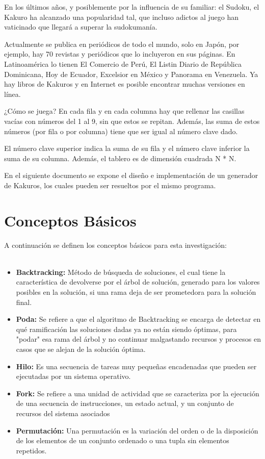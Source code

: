 \documentclass[journal]{IEEEtran}
\begin{document}
	En los últimos años, y posiblemente por la influencia de su familiar: el Sudoku, el Kakuro ha alcanzado una popularidad tal, que incluso adictos al juego han vaticinado que llegará a superar la sudokumanía.
	
	Actualmente se publica en periódicos de todo el mundo, solo en Japón, por ejemplo, hay 70 revistas y periódicos que lo incluyeron en sus páginas. En Latinoamérica lo tienen El Comercio de Perú, El Listin Diario de República Dominicana, Hoy de Ecuador, Excelsior en México y Panorama en Venezuela. Ya hay libros de Kakuros y en Internet es posible encontrar muchas versiones en línea.
	
	¿Cómo se juega? En cada fila y en cada columna hay que rellenar las casillas vacías con números del 1 al 9, sin que estos se repitan. Además, las suma de estos números (por fila o por columna) tiene que ser igual al número clave dado.
	
	El número clave superior indica la suma de su fila y el número clave inferior la suma de su columna. Además, el tablero es de dimensión cuadrada N * N. 
	
	En el siguiente documento se expone el diseño e implementación de un generador de Kakuros, los cuales pueden ser resueltos por el mismo programa.


 
\section{Conceptos Básicos}

A continuación se definen los conceptos básicos para esta investigación:\\
	\\
	\begin{itemize}
	\item{\bf Backtracking:} Método de búsqueda de soluciones, el cual tiene la característica de devolverse por el árbol de solución, generado para los valores posibles en la solución, si una rama deja de ser prometedora para la solución final.
	\item{\bf Poda:} Se refiere a que el algoritmo de Backtracking se encarga de detectar en qué ramificación las soluciones dadas ya no están siendo óptimas, para "podar" esa rama del árbol y no continuar malgastando recursos y procesos en casos que se alejan de la solución óptima.
	\item{\bf Hilo:} Es una secuencia de tareas muy pequeñas encadenadas  que pueden ser ejecutadas por un sistema operativo. 
	\item{\bf Fork:}  Se refiere a una unidad de actividad que se caracteriza por la ejecución de una secuencia de instrucciones, un estado actual, y un conjunto de recursos del sistema asociados
	\item{\bf Permutación:}  Una permutación es la variación del orden o de la disposición de los elementos de un conjunto ordenado o una tupla sin elementos repetidos.
	\end{itemize}
\end{document}
